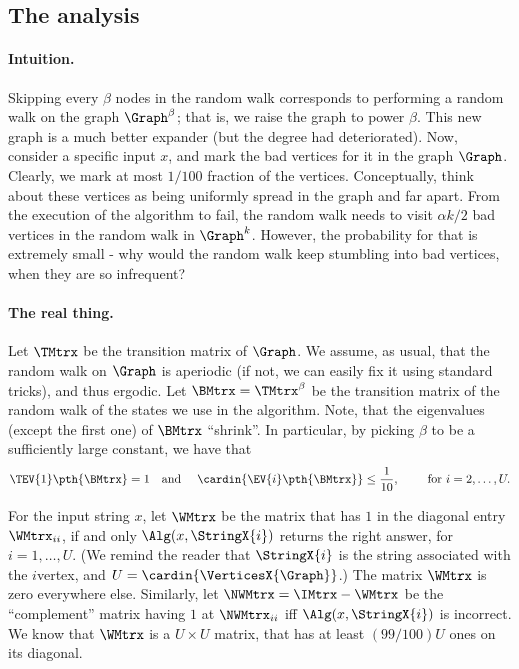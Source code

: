\subsection{The analysis}

\paragraph*{Intuition.}

Skipping every $\beta$ nodes in the random walk corresponds to
performing a random walk on the graph $\Graph^\beta$; that is, we
raise the graph to power $\beta$. This new graph is a much better
expander (but the degree had deteriorated). Now, consider a specific
input $x$, and mark the bad vertices for it in the graph
$\Graph$. Clearly, we mark at most $1/100$ fraction of the
vertices. Conceptually, think about these vertices as being uniformly
spread in the graph and far apart. From the execution of the algorithm
to fail, the random walk needs to visit $\alpha k/2$ bad vertices in
the random walk in $\Graph^k$. However, the probability for that is
extremely small - why would the random walk keep stumbling into bad
vertices, when they are so infrequent?



\paragraph*{The real thing.}

Let $\TMtrx$ be the transition matrix of $\Graph$. We assume, as
usual, that the random walk on $\Graph$ is aperiodic (if not, we can
easily fix it using standard tricks), and thus ergodic. Let $\BMtrx =
\TMtrx^\beta$ be the transition matrix of the random walk of the
states we use in the algorithm. Note, that the eigenvalues (except the
first one) of $\BMtrx$ ``shrink''. In particular, by picking $\beta$
to be a sufficiently large constant, we have that 
\begin{equation*}
  \TEV{1}\pth{\bigl. \BMtrx} =1%
  \text{\quad and \quad}%
  \cardin{\smash{\EV{i}\pth{\bigl.\BMtrx}}} \leq \frac{1}{10},%
  \qquad \text{ for }i=2,\ldots, U.
\end{equation*}

For the input string $x$, let $\WMtrx$ be the matrix that has $1$ in
the diagonal entry $\WMtrx_{ii}$, if and only $\Alg(x, \StringX{i})$
returns the right answer, for $i=1,\ldots, U$. (We remind the reader
that $\StringX{i}$ is the string associated with the $i$\th vertex,
and $U =\cardin{\VerticesX{\Graph}}$.)  The matrix $\WMtrx$ is zero
everywhere else. Similarly, let $\NWMtrx =\IMtrx - \WMtrx$ be the
``complement'' matrix having $1$ at $\NWMtrx_{ii}$ iff $\Alg(x,
\StringX{i})$ is incorrect. We know that $\WMtrx$ is a $U \times U$
matrix, that has at least $(99/100)U$ ones on its diagonal.

